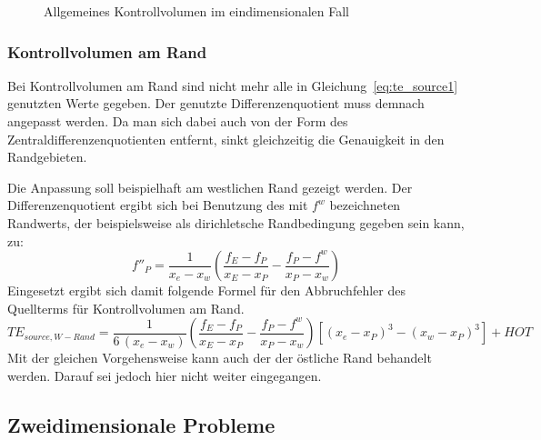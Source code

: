 \begin{figure}[bt]

\centering
\caption{Allgemeines Kontrollvolumen im eindimensionalen Fall}
\label{fig:kv1d}
\end{figure}

\subsubsection{Kontrollvolumen am Rand}

Bei Kontrollvolumen am Rand sind nicht mehr alle in Gleichung~\eqref{eq:te_source1}
genutzten Werte gegeben. Der genutzte Differenzenquotient muss demnach angepasst werden.
Da man sich dabei auch von der Form des Zentraldifferenzenquotienten entfernt,
sinkt gleichzeitig die Genauigkeit in den Randgebieten.

Die Anpassung soll beispielhaft am westlichen Rand gezeigt werden. Der Differenzenquotient
ergibt sich bei Benutzung des mit $f^w$ bezeichneten Randwerts, der beispielsweise als
dirichletsche Randbedingung gegeben sein kann, zu:
\begin{equation}
  f''_P = \frac{1}{x_e-x_w}\left(\frac{f_E-f_P}{x_E-x_P}-\frac{f_P-f^w}{x_P-x_w}\right)
\end{equation}
Eingesetzt ergibt sich damit folgende Formel für den Abbruchfehler des Quellterms
für Kontrollvolumen am Rand.
\begin{equation}
  TE_{source, W-Rand} =
\frac{1}{6\,(x_e-x_w)}\left(\frac{f_E-f_P}{x_E-x_P}-\frac{f_P-f^w}{x_P-x_w}\right)
  \left[{{(x_e-x_P)}^3-{(x_w-x_P)}^3}\right] + HOT
\end{equation}
Mit der gleichen Vorgehensweise kann auch der der östliche Rand behandelt werden. Darauf
sei jedoch hier nicht weiter eingegangen.




\subsection{Zweidimensionale Probleme}


